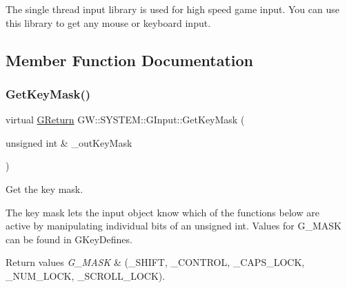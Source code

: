The single thread input library is used for high speed game input. You can use this library to get any mouse or keyboard input. 

\subsection{Member Function Documentation}
\mbox{\label{class_g_w_1_1_s_y_s_t_e_m_1_1_g_input_a448ee14346a393286b0dfe1dc61ca93d}} 
\subsubsection{\texorpdfstring{Get\+Key\+Mask()}{GetKeyMask()}}
{\footnotesize\ttfamily virtual \mbox{\hyperlink{namespace_g_w_a67a839e3df7ea8a5c5686613a7a3de21}{G\+Return}} G\+W\+::\+S\+Y\+S\+T\+E\+M\+::\+G\+Input\+::\+Get\+Key\+Mask (\begin{DoxyParamCaption}\item[{unsigned int \&}]{\+\_\+out\+Key\+Mask }\end{DoxyParamCaption})\hspace{0.3cm}{\ttfamily [pure virtual]}}



Get the key mask. 

The key mask lets the input object know which of the functions below are ~\newline
active by manipulating individual bits of an unsigned int. Values for G\+\_\+\+M\+A\+SK can be found in G\+Key\+Defines.


\begin{DoxyRetVals}{Return values}
{\em G\+\_\+\+M\+A\+SK} & (\+\_\+\+S\+H\+I\+FT, \+\_\+\+C\+O\+N\+T\+R\+OL, \+\_\+\+C\+A\+P\+S\+\_\+\+L\+O\+CK, \+\_\+\+N\+U\+M\+\_\+\+L\+O\+CK, \+\_\+\+S\+C\+R\+O\+L\+L\+\_\+\+L\+O\+CK). \\
\hline
\end{DoxyRetVals}
\mbox{\label{class_g_w_1_1_s_y_s_t_e_m_1_1_g_input_a775fca7ad71371f369e3ad69fb32603a}} 
